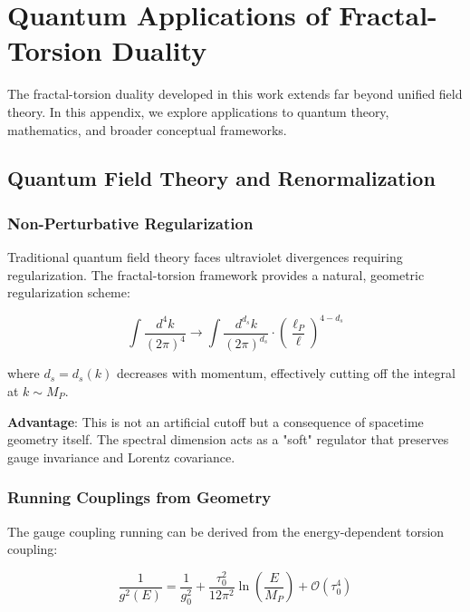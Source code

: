 \section{Quantum Applications of Fractal-Torsion Duality}
\label{app:quantum_applications}

The fractal-torsion duality developed in this work extends far beyond unified field theory. In this appendix, we explore applications to quantum theory, mathematics, and broader conceptual frameworks.

\subsection{Quantum Field Theory and Renormalization}

\subsubsection{Non-Perturbative Regularization}

Traditional quantum field theory faces ultraviolet divergences requiring regularization. The fractal-torsion framework provides a natural, geometric regularization scheme:

\begin{equation}
    \int \frac{d^4k}{(2\pi)^4} \to \int \frac{d^{d_s}k}{(2\pi)^{d_s}} \cdot \left(\frac{\ell_P}{\ell}\right)^{4-d_s}
\end{equation}

where $d_s = d_s(k)$ decreases with momentum, effectively cutting off the integral at $k \sim M_P$.

\textbf{Advantage}: This is not an artificial cutoff but a consequence of spacetime geometry itself. The spectral dimension acts as a "soft" regulator that preserves gauge invariance and Lorentz covariance.

\subsubsection{Running Couplings from Geometry}

The gauge coupling running can be derived from the energy-dependent torsion coupling:

\begin{equation}
    \frac{1}{g^2(E)} = \frac{1}{g_0^2} + \frac{\tau_0^2}{12\pi^2} \ln\left(\frac{E}{M_P}\right) + \mathcal{O}(\tau_0^4)
\end{equation}

